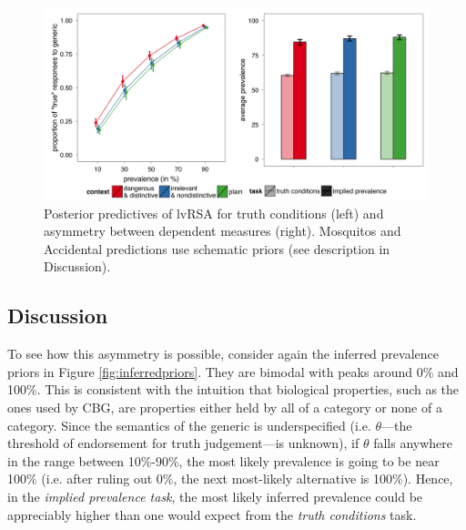 \documentclass[10pt,letterpaper]{article}
\begin{document}

\begin{figure}
\centering
    \includegraphics[width=\columnwidth]{lvRSA_postpreds}
    \caption{Posterior predictives of lvRSA for truth conditions (left) and asymmetry between dependent measures (right). Mosquitos and Accidental predictions use schematic priors (see description in Discussion).}
  \label{fig:lvRSAposteriorpred}
\end{figure}

\subsection{Discussion}

To see how this asymmetry is possible, consider again the inferred prevalence priors in Figure \ref{fig:inferredpriors}. They are bimodal with peaks around 0\% and 100\%. This is consistent with the intuition that biological properties, such as the ones used by CBG, are properties either held by all of a category or none of a category. Since the semantics of the generic is underspecified (i.e. $\theta$---the threshold of endorsement for truth judgement---is unknown), if $\theta$ falls anywhere in the range between 10\%-90\%, the most likely prevalence is going to be near 100\% (i.e. after ruling out 0\%, the next most-likely alternative is 100\%). Hence, in the \emph{implied prevalence task}, the most likely inferred prevalence could be appreciably higher than one would expect from the \emph{truth conditions} task. 




\end{document}
